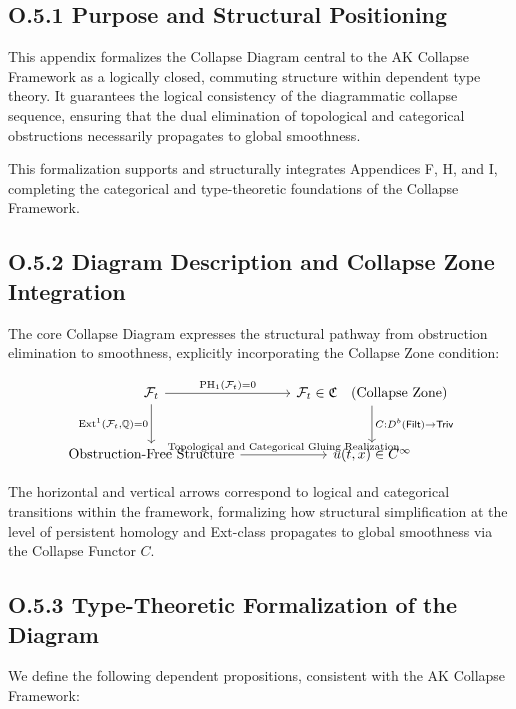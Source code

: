 \documentclass[11pt]{article}
\begin{document}
\subsection*{O.5.1 Purpose and Structural Positioning}

This appendix formalizes the Collapse Diagram central to the AK Collapse Framework as a logically closed, commuting structure within dependent type theory.  
It guarantees the logical consistency of the diagrammatic collapse sequence, ensuring that the dual elimination of topological and categorical obstructions necessarily propagates to global smoothness.

This formalization supports and structurally integrates Appendices F, H, and I, completing the categorical and type-theoretic foundations of the Collapse Framework.

\subsection*{O.5.2 Diagram Description and Collapse Zone Integration}

The core Collapse Diagram expresses the structural pathway from obstruction elimination to smoothness, explicitly incorporating the Collapse Zone condition:

\[
\begin{tikzcd}[row sep=large, column sep=large]
\mathcal{F}_t
  \arrow[r, "{\mathrm{PH}_1(\mathcal{F}_t) = 0}"]
  \arrow[d, "{\mathrm{Ext}^1(\mathcal{F}_t, \mathbb{Q}) = 0}"']
& \mathcal{F}_t \in \mathfrak{C} \quad \text{(Collapse Zone)} 
  \arrow[d, "{C : D^b(\mathsf{Filt}) \to \mathsf{Triv}}"] \\
\text{Obstruction-Free Structure}
  \arrow[r, "{\text{Topological and Categorical Gluing Realization}}"]
& u(t, x) \in C^\infty
\end{tikzcd}
\]

The horizontal and vertical arrows correspond to logical and categorical transitions within the framework, formalizing how structural simplification at the level of persistent homology and Ext-class propagates to global smoothness via the Collapse Functor \( C \).

\subsection*{O.5.3 Type-Theoretic Formalization of the Diagram}

We define the following dependent propositions, consistent with the AK Collapse Framework:
\end{document}
